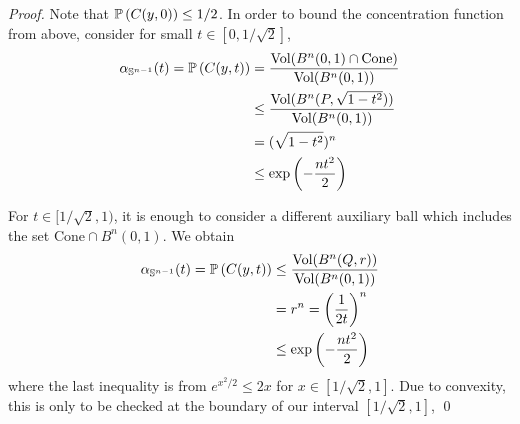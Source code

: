 \documentclass[11pt]{article}
\begin{document}
\begin{itemize}
\begin{proof}
Note that ${\mathbb P}\left(C(y, 0)\right) \le 1/2$.  In order to bound the concentration function from above, consider for small $t \in [0, 1/\sqrt{2}]$,
\begin{align*}
\alpha_{{\mathbb S}^{n-1}}(t) = {\mathbb P}\left(C(y, t)\right) &= \frac{\text{Vol}(B^n(0, 1)\cap \text{Cone})}{\text{Vol}(B^{n}(0,1))} \\
&\le \frac{\text{Vol}(B^n(P,  \sqrt{1 - t^2}))}{\text{Vol}(B^{n}(0,1))}\\
&= (\sqrt{1 - t^2})^{n} \\
&\le \exp\left(-  \frac{nt^2}{2}\right)
\end{align*}

For $t \in [1/\sqrt{2}, 1)$, it is enough to consider a different auxiliary ball which includes the set $\text{Cone} \cap B^n(0, 1)$. We obtain
\begin{align*}
\alpha_{{\mathbb S}^{n-1}}(t) = {\mathbb P}\left(C(y, t)\right) & \le \frac{\text{Vol}(B^n(Q,  r))}{\text{Vol}(B^{n}(0,1))}\\
&= r^n = \left(\frac{1}{2t}\right)^n\\
&\le \exp\left(-\frac{n t^2}{2}\right)
\end{align*} where the last inequality is from $e^{x^2/2} \le 2x$ for $x \in [1/\sqrt{2}, 1]$. Due to convexity, this is only to be checked at the boundary of our interval
$[1/\sqrt{2}, 1]$,  \qed
\end{proof}


\end{itemize}
\end{document}
